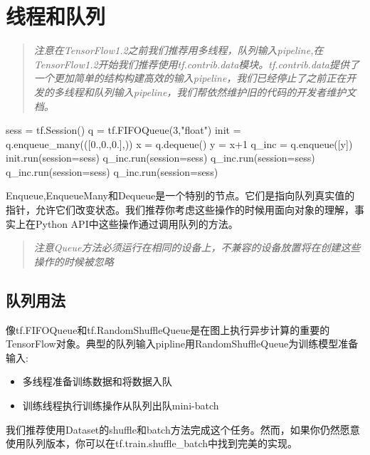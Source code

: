 \section{线程和队列}
\begin{quote}
	\emph{注意在TensorFlow1.2之前我们推荐用多线程，队列输入pipeline,在TensorFlow1.2开始我们推荐使用tf.contrib.data模块。tf.contrib.data提供了一个更加简单的结构构建高效的输入pipeline，我们已经停止了之前正在开发的多线程和队列输入pipeline，我们帮依然维护旧的代码的开发者维护文档。}
\end{quote}
\begin{python}
sess = tf.Session()
q = tf.FIFOQueue(3,"float")
init = q.enqueue_many(([0.,0.,0.],))
x = q.dequeue()
y = x+1
q_inc = q.enqueue([y])
init.run(session=sess)
q_inc.run(session=sess)
q_inc.run(session=sess)
q_inc.run(session=sess)
q_inc.run(session=sess)
\end{python}
Enqueue,EnqueueMany和Dequeue是一个特别的节点。它们是指向队列真实值的指针，允许它们改变状态。我们推荐你考虑这些操作的时候用面向对象的理解，事实上在Python API中这些操作通过调用队列的方法。
\begin{quote}
	\emph{注意Queue方法必须运行在相同的设备上，不兼容的设备放置将在创建这些操作的时候被忽略}
\end{quote}
\subsection{队列用法}
像tf.FIFOQueue和tf.RandomShuffleQueue是在图上执行异步计算的重要的TensorFlow对象。典型的队列输入pipline用RandomShuffleQueue为训练模型准备输入:
\begin{itemize}
	\item 多线程准备训练数据和将数据入队
	\item 训练线程执行训练操作从队列出队mini-batch
\end{itemize}
我们推荐使用Dataset的shuffle和batch方法完成这个任务。然而，如果你仍然愿意使用队列版本，你可以在tf.train.shuffle\_batch中找到完美的实现。

